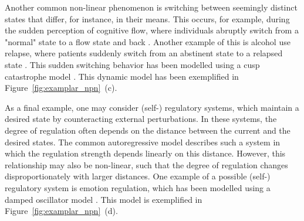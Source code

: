 \documentclass[man, floatsintext]{apa7}
\begin{document}
Another common non-linear phenomenon is switching between seemingly distinct
states that differ, for instance, in their means. This occurs, for example,
during the sudden perception of cognitive flow, where individuals abruptly
switch from a "normal" state to a flow state and back
\parencite{ceja_suddenly_2012}. Another example of this is alcohol use relapse,
where patients suddenly switch from an abstinent state to a relapsed state
\parencite{witkiewitz_modeling_2007}. This sudden switching behavior has been
modelled using a cusp catastrophe model
\parencite{van_der_maas_sudden_2003,chow_cusp_2015}. This dynamic model has
been exemplified in Figure~\ref{fig:examplar_npn}~(c).

As a final example, one may consider (self-) regulatory systems, which maintain
a desired state by counteracting external perturbations. In these systems, the
degree of regulation often depends on the distance between the current and the
desired states. The common autoregressive model describes such a system in
which the regulation strength depends linearly on this distance. However, this
relationship may also be non-linear, such that the degree of regulation changes
disproportionately with larger distances. One example of a possible (self-)
regulatory system is emotion regulation, which has been modelled using a
damped oscillator model \parencite{chow_emotion_2005}. This model is
exemplified in Figure~\ref{fig:examplar_npn}~(d).
\end{document}
